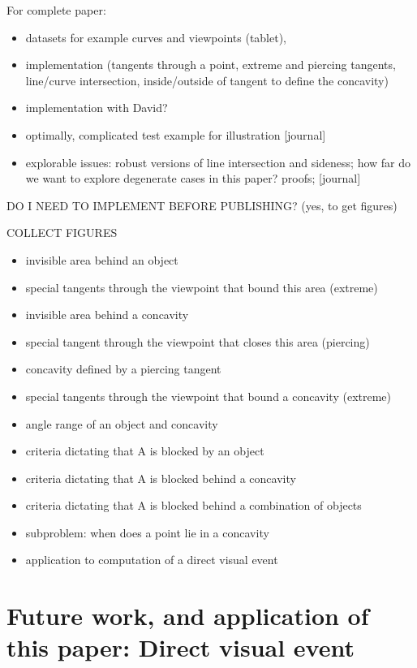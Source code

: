\documentclass[12pt]{article}
\begin{document}
For complete paper:
\begin{itemize}
\item
datasets for example curves and viewpoints (tablet),
\item
implementation (tangents through a point, extreme and piercing tangents,
  line/curve intersection, inside/outside of tangent to define the concavity)
\item
implementation with David?
\item
optimally, complicated test example for illustration [journal]
\item
explorable issues: robust versions of line intersection and sideness;
  how far do we want to explore degenerate cases in this paper?
  proofs; [journal]
\end{itemize}

DO I NEED TO IMPLEMENT BEFORE PUBLISHING? (yes, to get figures)

COLLECT FIGURES

\begin{itemize}
\item invisible area behind an object
\item special tangents through the viewpoint that bound this area (extreme)
\item invisible area behind a concavity
\item special tangent through the viewpoint that closes this area (piercing)
\item concavity defined by a piercing tangent
\item special tangents through the viewpoint that bound a concavity (extreme) 
\item angle range of an object and concavity
\item criteria dictating that A is blocked by an object
\item criteria dictating that A is blocked behind a concavity
\item criteria dictating that A is blocked behind a combination of objects
\item subproblem: when does a point lie in a concavity
\item application to computation of a direct visual event
\end{itemize}


\section{Future work, and application of this paper: Direct visual event}
\end{document}
